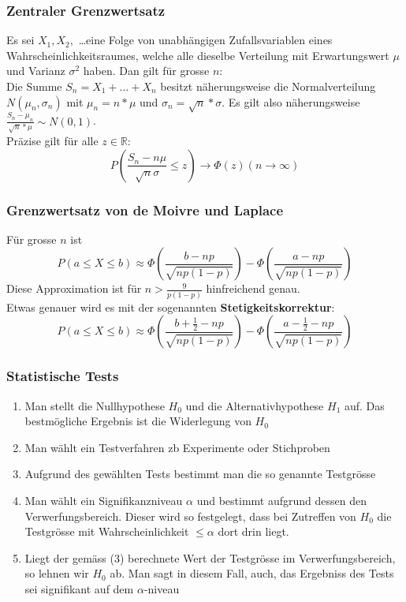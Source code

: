 \documentclass[landscape,twocolumn,a4paper]{article}
\newcommand{\RN}{\mathbb{R}} %
\begin{document}
\subsubsection*{Zentraler Grenzwertsatz}
Es sei $X_1, X_2,$ \dots eine Folge von unabhängigen Zufallsvariablen eines  Wahrscheinlichkeitsraumes, welche alle dieselbe Verteilung mit Erwartungswert $\mu$ und Varianz $\sigma^2$ haben. Dan gilt für grosse $n$: \\
Die Summe $S_n = X_1 + \dots + X_n$ besitzt näherungsweise die Normalverteilung $N(\mu_n, \sigma_n)$ mit $\mu_n = n * \mu$ und $\sigma_n = \sqrt{n} * \sigma$. Es gilt also näherungsweise $ \frac{S_n - \mu_n}{\sqrt{n} * \mu} \sim N(0,1)$. \\
Präzise gilt für alle $z \in \RN$:
\begin{equation*}
P(\frac{S_n - n\mu}{\sqrt{n}\sigma} \leq z) \rightarrow \Phi(z) (n \rightarrow \infty)
\end{equation*}
\subsubsection*{Grenzwertsatz von de Moivre und Laplace}
Für grosse $n$ ist
\begin{equation*}
P(a \leq X \leq b) \approx \Phi (\frac{b - np}{\sqrt{np(1-p)}}) - \Phi (\frac{a - np}{\sqrt{np(1-p)}})
\end{equation*}
Diese Approximation ist für $n > \frac{9}{p(1-p)}$ hinfreichend genau. \\
Etwas genauer wird es mit der sogenannten \textbf{Stetigkeitskorrektur}:
\begin{equation*}
P(a \leq X \leq b) \approx \Phi(\frac{b + \frac{1}{2} - np}{\sqrt{np(1-p)}}) - \Phi(\frac{a - \frac{1}{2} - np}{\sqrt{np(1-p)}})
\end{equation*}

\subsubsection*{Statistische Tests}
\begin{enumerate}
	\item Man stellt die Nullhypothese $H_0$ und die Alternativhypothese $H_1$ auf. Das bestmögliche Ergebnis ist die Widerlegung von $H_0$
	\item Man wählt ein Testverfahren zb Experimente oder Stichproben
	\item Aufgrund des gewählten Tests bestimmt man die so genannte Testgrösse
	\item Man wählt ein Signifikanzniveau $\alpha$ und bestimmt aufgrund dessen den Verwerfungsbereich. Dieser wird so festgelegt, dass bei Zutreffen von $H_0$ die Testgrösse mit Wahrscheinlichkeit $\leq \alpha$ dort drin liegt. 
	\item Liegt der gemäss (3) berechnete Wert der Testgrösse im Verwerfungsbereich, so lehnen wir $H_0$ ab. Man sagt in diesem Fall, auch, das Ergebniss des Tests sei signifikant auf dem $\alpha$-niveau
\end{enumerate}
\end{document}
